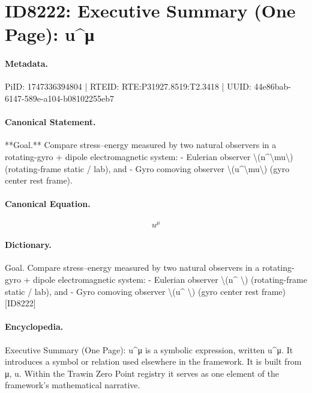 \section*{ID8222: Executive Summary (One Page): u\textasciicircum{}μ}
\paragraph{Metadata.}
PiID: 1747336394804 | RTEID: RTE:P31927.8519:T2.3418 | UUID: 44e86bab-6147-589e-a104-b08102255eb7

\paragraph{Canonical Statement.}
**Goal.** Compare stress–energy measured by two natural observers in a rotating-gyro + dipole electromagnetic system: - Eulerian observer \textbackslash{}(n\textasciicircum{}\textbackslash{}mu\textbackslash{}) (rotating-frame static / lab), and - Gyro comoving observer \textbackslash{}(u\textasciicircum{}\textbackslash{}mu\textbackslash{}) (gyro center rest frame).

\paragraph{Canonical Equation.}
\[
u^\mu
\]

\paragraph{Dictionary.}
Goal. Compare stress–energy measured by two natural observers in a rotating-gyro + dipole electromagnetic system: - Eulerian observer \textbackslash{}(n\textasciicircum{} \textbackslash{}) (rotating-frame static / lab), and - Gyro comoving observer \textbackslash{}(u\textasciicircum{} \textbackslash{}) (gyro center rest frame) [ID8222]

\paragraph{Encyclopedia.}
Executive Summary (One Page): u\textasciicircum{}μ is a symbolic expression, written u\textasciicircum{}μ. It introduces a symbol or relation used elsewhere in the framework. It is built from μ, u. Within the Trawin Zero Point registry it serves as one element of the framework's mathematical narrative.
